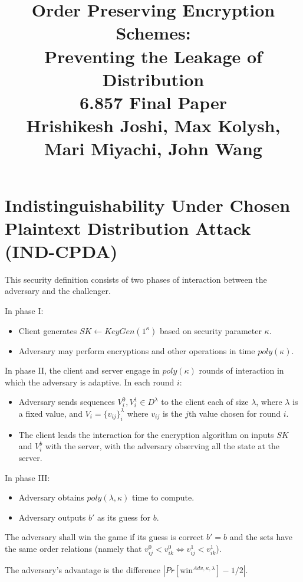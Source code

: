\documentclass[12pt]{article}
\title{Order Preserving Encryption Schemes: \\
  Preventing the Leakage of Distribution\\
6.857 Final Paper \\
Hrishikesh Joshi, Max Kolysh, Mari Miyachi, John Wang}
\newenvironment{definition}[1][Definition]{\begin{trivlist}
\item[\hskip \labelsep {\bfseries #1}]}{\end{trivlist}}
\begin{document}
\maketitle

\section{Indistinguishability Under Chosen Plaintext Distribution Attack (IND-CPDA)}

This security definition consists of two phases of interaction between the adversary and the challenger.

In phase I:
\begin{itemize}
  \item Client generates $SK \leftarrow KeyGen(1^\kappa)$ based on security parameter $\kappa$.
  \item Adversary may perform encryptions and other operations in time $poly(\kappa)$.
\end{itemize}

In phase II, the client and server engage in $poly(\kappa)$ rounds of interaction in which the adversary is adaptive. In each round $i$:
\begin{itemize}
  \item Adversary sends sequences $V_i^0, V_i^1 \in D^{\lambda}$ to the client each of size $\lambda$, where $\lambda$ is a fixed value, and $V_i = \{ v_{ij} \}_i^{\lambda}$ where $v_{ij}$ is the $j$th value chosen for round $i$.
  \item The client leads the interaction for the encryption algorithm on inputs $SK$ and $V_i^b$ with the server, with the adversary observing all the state at the server.
\end{itemize}

In phase III:
\begin{itemize}
  \item Adversary obtains $poly(\lambda, \kappa)$ time to compute.
  \item Adversary outputs $b'$ as its guess for $b$. 
\end{itemize}

The adversary shall win the game if its guess is correct $b' = b$ and the sets have the same order relations (namely that $v_{ij}^0 < v_{ik}^0 \Leftrightarrow v_{ij}^1 < v_{ik}^1$).

\begin{definition}
  The adversary's advantage is the difference $|Pr[\textrm{win}^{Adv, \kappa, \lambda}] - 1/2|$.
\end{definition}
\end{document}

